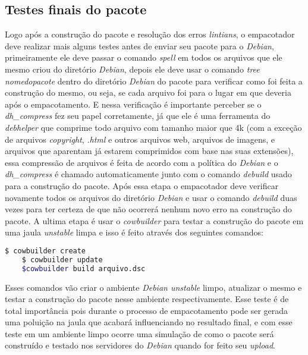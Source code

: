 \subsection{Testes finais do pacote}

Logo após a construção do pacote e resolução dos erros \textit{lintians}, o empacotador deve realizar mais alguns testes antes de enviar seu pacote para o \textit{Debian}, primeiramente ele deve passar o comando \textit{spell} em todos os arquivos que ele mesmo criou do diretório \textit{Debian}, depois ele deve usar o comando \textit{tree nomedopacote} dentro do diretório \textit{Debian} do pacote para verificar como foi feita a construção do mesmo, ou seja, se cada arquivo foi para o lugar em que deveria após o empacotamento. E nessa verificação é importante perceber se o \textit{dh\_compress} fez seu papel corretamente, já que ele é uma ferramenta do \textit{debhelper} que comprime todo arquivo com tamanho maior que 4k (com a exceção de arquivos \textit{copyright}, \textit{.html} e outros arquivos web, arquivos de imagens, e arquivos que aparentam já estarem comprimidos com base nas suas extensões), essa compressão de arquivos é feita de acordo com a política do \textit{Debian} e o \textit{dh\_compress} é chamado automaticamente junto com o comando \textit{debuild} usado para a construção do pacote. Após essa etapa o empacotador deve verificar novamente todos os arquivos do diretório \textit{Debian} e usar o comando \textit{debuild} duas vezes para ter certeza de que não ocorrerá nenhum novo erro na construção do pacote. A ultima etapa é usar o \textit{cowbuilder} para testar a construção do pacote em uma jaula \textit{unstable} limpa e isso é feito através dos seguintes comandos:

\begin{lstlisting}[language=bash]
	$ cowbuilder create
	$ cowbuilder update
	$cowbuilder build arquivo.dsc
\end{lstlisting} 

Esses comandos vão criar o ambiente \textit{Debian unstable} limpo, atualizar o mesmo e testar a construção do pacote nesse ambiente respectivamente. Esse teste é de total importância pois durante o processo de empacotamento pode ser gerada uma poluição na jaula que acabará influenciando no resultado final, e com esse teste em um ambiente limpo ocorre uma simulação de como o pacote será construído e testado nos servidores do \textit{Debian} quando for feito seu \textit{upload}.